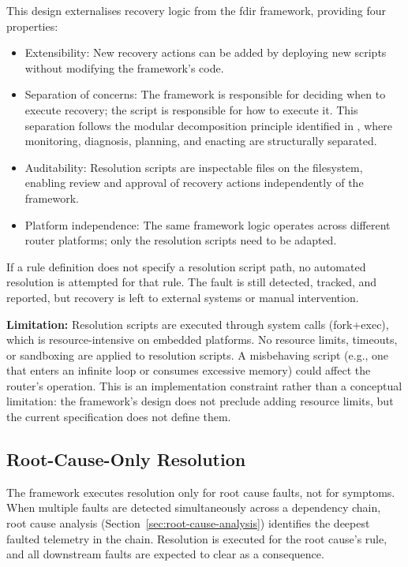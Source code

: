 This design externalises recovery logic from the \gls{fdir} framework, providing four properties:

\begin{itemize}
\item Extensibility: New recovery actions can be added by deploying new scripts without modifying the framework's code.
\item Separation of concerns: The framework is responsible for deciding when to execute recovery; the script is responsible for how to execute it. This separation follows the modular decomposition principle identified in \cite{ref21}, where monitoring, diagnosis, planning, and enacting are structurally separated.
\item Auditability: Resolution scripts are inspectable files on the filesystem, enabling review and approval of recovery actions independently of the framework.
\item Platform independence: The same framework logic operates across different router platforms; only the resolution scripts need to be adapted.
\end{itemize}

If a rule definition does not specify a resolution script path, no automated resolution is attempted for that rule. The fault is still detected, tracked, and reported, but recovery is left to external systems or manual intervention.

\textbf{Limitation:} Resolution scripts are executed through system calls (fork+exec), which is resource-intensive on embedded platforms. No resource limits, timeouts, or sandboxing are applied to resolution scripts. A misbehaving script (e.g., one that enters an infinite loop or consumes excessive memory) could affect the router's operation. This is an implementation constraint rather than a conceptual limitation: the framework's design does not preclude adding resource limits, but the current specification does not define them.

\subsection{Root-Cause-Only Resolution}\label{sec:root-cause-only}

The framework executes resolution only for root cause faults, not for symptoms. When multiple faults are detected simultaneously across a dependency chain, root cause analysis (Section~\ref{sec:root-cause-analysis}) identifies the deepest faulted telemetry in the chain. Resolution is executed for the root cause's rule, and all downstream faults are expected to clear as a consequence.

